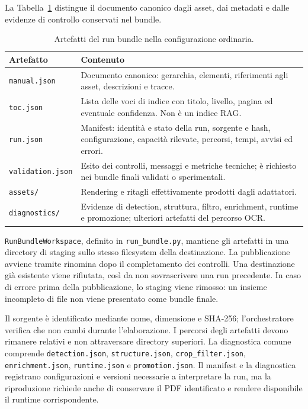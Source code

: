 La Tabella~\ref{tab:run-bundle} distingue il documento canonico dagli asset, dai metadati e dalle evidenze di controllo conservati nel bundle.

\begin{table}[!htbp]
\centering
\caption{Artefatti del run bundle nella configurazione ordinaria.}
\label{tab:run-bundle}
\small
\begin{tabularx}{\textwidth}{@{}p{}X@{}}
\toprule
Artefatto & Contenuto \\
\midrule
\texttt{manual.json} & Documento canonico: gerarchia, elementi, riferimenti agli asset, descrizioni e tracce. \\
\texttt{toc.json} & Lista delle voci di indice con titolo, livello, pagina ed eventuale confidenza. Non è un indice RAG. \\
\texttt{run.json} & Manifest: identità e stato della run, sorgente e hash, configurazione, capacità rilevate, percorsi, tempi, avvisi ed errori. \tabularnewline
\texttt{validation.json} & Esito dei controlli, messaggi e metriche tecniche; è richiesto nei bundle finali validati o sperimentali. \\
\texttt{assets/} & Rendering e ritagli effettivamente prodotti dagli adattatori. \\
\texttt{diagnostics/} & Evidenze di detection, struttura, filtro, enrichment, runtime e promozione; ulteriori artefatti del percorso OCR. \\
\bottomrule
\end{tabularx}
\end{table}

\texttt{RunBundleWorkspace}, definito in \texttt{run\_bundle.py}, mantiene gli artefatti in una directory di staging sullo stesso filesystem della destinazione. La pubblicazione avviene tramite rinomina dopo il completamento dei controlli. Una destinazione già esistente viene rifiutata, così da non sovrascrivere una run precedente. In caso di errore prima della pubblicazione, lo staging viene rimosso: un insieme incompleto di file non viene presentato come bundle finale.

Il sorgente è identificato mediante nome, dimensione e SHA-256; l'orchestratore verifica che non cambi durante l'elaborazione. I percorsi degli artefatti devono rimanere relativi e non attraversare directory superiori. La diagnostica comune comprende \texttt{detection.json}, \texttt{structure.json}, \texttt{crop\_filter.json}, \texttt{enrichment.json}, \texttt{runtime.json} e \texttt{promotion.json}. Il manifest e la diagnostica registrano configurazioni e versioni necessarie a interpretare la run, ma la riproduzione richiede anche di conservare il PDF identificato e rendere disponibile il runtime corrispondente.

